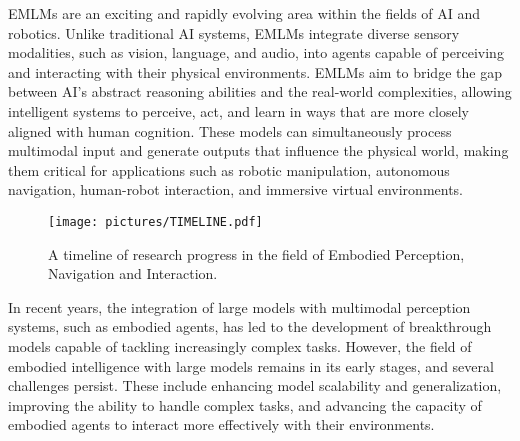 EMLMs are an exciting and rapidly evolving area within the fields of AI and robotics. Unlike traditional AI systems, EMLMs integrate diverse sensory modalities, such as vision, language, and audio, into agents capable of perceiving and interacting with their physical environments. EMLMs aim to bridge the gap between AI’s abstract reasoning abilities and the real-world complexities, allowing intelligent systems to perceive, act, and learn in ways that are more closely aligned with human cognition. These models can simultaneously process multimodal input and generate outputs that influence the physical world, making them critical for applications such as robotic manipulation, autonomous navigation, human-robot interaction, and immersive virtual environments.

\begin{figure*}[t]
	\centering
	\texttt{[image: pictures/TIMELINE.pdf]}
	
	\caption{A timeline of research progress in the field of Embodied Perception, Navigation and Interaction.}
	\label{fig:Section3}
\end{figure*}

In recent years, the integration of large models with multimodal perception systems, such as embodied agents, has led to the development of breakthrough models capable of tackling increasingly complex tasks. However, the field of embodied intelligence with large models remains in its early stages, and several challenges persist. These include enhancing model scalability and generalization, improving the ability to handle complex tasks, and advancing the capacity of embodied agents to interact more effectively with their environments.

